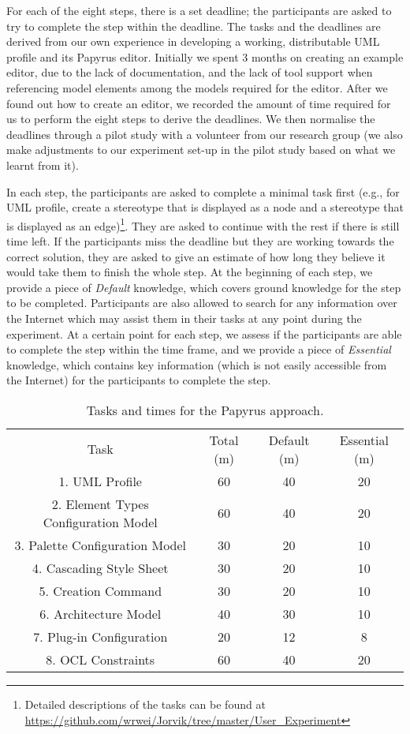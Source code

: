 For each of the eight steps, there is a set deadline; the participants are asked to try to complete the step within the deadline.
The tasks and the deadlines are derived from our own experience in developing a working, distributable UML profile and its Papyrus editor. 
Initially we spent 3 months on creating an example editor, due to the lack of documentation, and the lack of tool support when referencing model elements among the models required for the editor.
After we found out how to create an editor, we recorded the amount of time required for us to perform the eight steps to derive the deadlines. 
We then normalise the deadlines through a pilot study with a volunteer from our research group (we also make adjustments to our experiment set-up in the pilot study based on what we learnt from it). 

In each step, the participants are asked to complete a minimal task first (e.g., for UML profile, create a stereotype that is displayed as a node and a stereotype that is displayed as an edge)\footnote{Detailed descriptions of the tasks can be found at \url{https://github.com/wrwei/Jorvik/tree/master/User_Experiment}}. 
They are asked to continue with the rest if there is still time left. 
If the participants miss the deadline but they are working towards the correct solution, they are asked to give an estimate of how long they believe it would take them to finish the whole step.
At the beginning of each step, we provide a piece of \textit{Default} knowledge, which covers ground knowledge for the step to be completed. 
Participants are also allowed to search for any information over the Internet which may assist them in their tasks at any point during the experiment.
At a certain point for each step, we assess if the participants are able to complete the step within the time frame, and we provide a piece of \textit{Essential} knowledge, which contains key information (which is not easily accessible from the Internet) for the participants to complete the step.

\begin{table}
	\centering
	\setlength{\tabcolsep}{3.5pt} 
	\begin{tabular}{|c|c|c|c|}
		Task & Total (m) & Default (m) & Essential (m) \\ 
		1. UML Profile & 60 & 40 & 20 \\
		2. Element Types Configuration Model & 60 & 40 & 20 \\
		3. Palette Configuration Model & 30 & 20 & 10 \\
		4. Cascading Style Sheet & 30 & 20 & 10 \\
		5. Creation Command & 30 & 20 & 10 \\
		6. Architecture Model & 40 & 30 & 10 \\
		7. Plug-in Configuration & 20 & 12 & 8 \\
		8. OCL Constraints & 60 & 40 & 20 \\
	\end{tabular}
	\caption{Tasks and times for the Papyrus approach.}
	\label{tab:manual}
\end{table}



